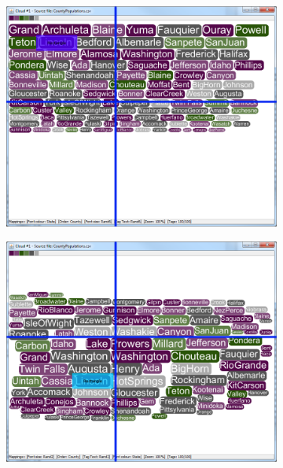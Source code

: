 \begin{figure}[!htb]
\begin{subfigure}{.5\textwidth}
  \includegraphics[scale=0.25]{Experiment1/Trial3/C1S2L2.png}
\end{subfigure}%
\begin{subfigure}{.5\textwidth}
  \centering
 \includegraphics[scale=0.25]{Experiment1/Trial3/C1S2L1.png}
\end{subfigure}
\begin{subfigure}{.5\textwidth}
  \centering

\end{subfigure}
\end{figure}
